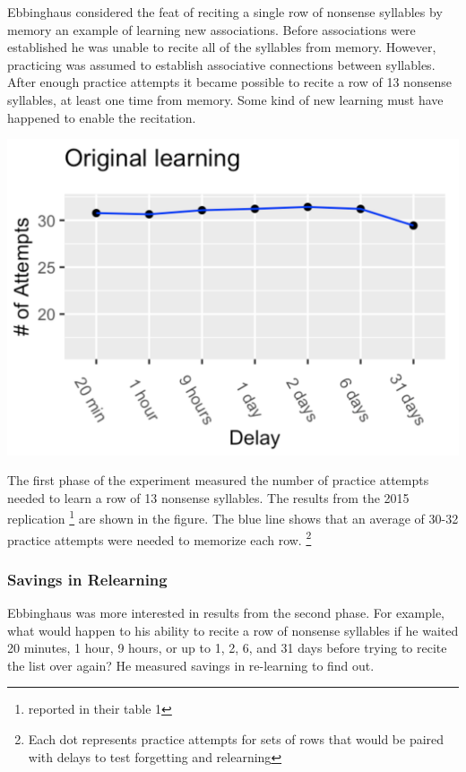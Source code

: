 \documentclass[
  oneside,
  12pt]{crumpbook}
\newenvironment{floatright50}{%
  \wrapfigure{R}{.5\textwidth}%
  }{%
  \endwrapfigure}
\begin{document}
Ebbinghaus considered the feat of reciting a single row of nonsense syllables by memory an example of learning new associations. Before associations were established he was unable to recite all of the syllables from memory. However, practicing was assumed to establish associative connections between syllables. After enough practice attempts it became possible to recite a row of 13 nonsense syllables, at least one time from memory. Some kind of new learning must have happened to enable the recitation.

\begin{floatright50}
\includegraphics[width=1\linewidth]{imgs/Ebbinghaus_OL}

\end{floatright50}

The first phase of the experiment measured the number of practice attempts needed to learn a row of 13 nonsense syllables. The results from the 2015 replication \footnote{reported in their table 1} are shown in the figure. The blue line shows that an average of 30-32 practice attempts were needed to memorize each row. \footnote{Each dot represents practice attempts for sets of rows that would be paired with delays to test forgetting and relearning}

\hypertarget{savings-in-relearning}{%
\subsubsection{Savings in Relearning}\label{savings-in-relearning}}

Ebbinghaus was more interested in results from the second phase. For example, what would happen to his ability to recite a row of nonsense syllables if he waited 20 minutes, 1 hour, 9 hours, or up to 1, 2, 6, and 31 days before trying to recite the list over again? He measured savings in re-learning to find out.
\end{document}
